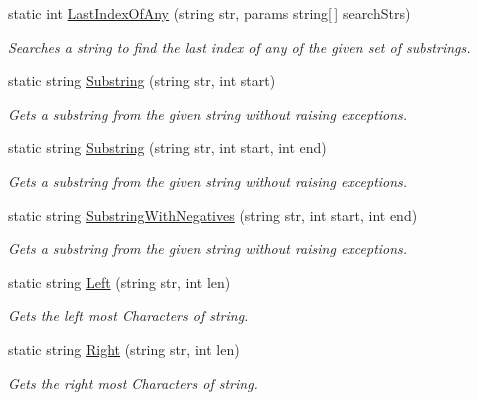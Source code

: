 \begin{DoxyCompactItemize}
static int \hyperlink{class_ultimate_1_1_utilities_1_1_string_utils_a3cb9c5e21faa29ecabb09534fa38c0b0}{Last\+Index\+Of\+Any} (string str, params string\mbox{[}$\,$\mbox{]} search\+Strs)
\begin{DoxyCompactList}\small\item\em Searches a string to find the last index of any of the given set of substrings. \end{DoxyCompactList}\item 
static string \hyperlink{class_ultimate_1_1_utilities_1_1_string_utils_a4c49d622cc3e0a043ce38437bee02fce}{Substring} (string str, int start)
\begin{DoxyCompactList}\small\item\em Gets a substring from the given string without raising exceptions. \end{DoxyCompactList}\item 
static string \hyperlink{class_ultimate_1_1_utilities_1_1_string_utils_a3e5d54e7592a54b8dab0df99b021acf9}{Substring} (string str, int start, int end)
\begin{DoxyCompactList}\small\item\em Gets a substring from the given string without raising exceptions. \end{DoxyCompactList}\item 
static string \hyperlink{class_ultimate_1_1_utilities_1_1_string_utils_a542ad8cea43ade0e4055c9741a2a4524}{Substring\+With\+Negatives} (string str, int start, int end)
\begin{DoxyCompactList}\small\item\em Gets a substring from the given string without raising exceptions. \end{DoxyCompactList}\item 
static string \hyperlink{class_ultimate_1_1_utilities_1_1_string_utils_a1619060685141d798e89dbbfc57c4dcb}{Left} (string str, int len)
\begin{DoxyCompactList}\small\item\em Gets the left most Characters of string. \end{DoxyCompactList}\item 
static string \hyperlink{class_ultimate_1_1_utilities_1_1_string_utils_ab72127d518bc89f25295df795720f59c}{Right} (string str, int len)
\begin{DoxyCompactList}\small\item\em Gets the right most Characters of string. \end{DoxyCompactList}\item 

\end{DoxyCompactItemize}
